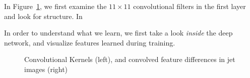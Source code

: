 In Figure~\ref{fig:convkernels}, we first examine the $11\times11$ convolutional filters in the first layer and look for structure. In

In order to understand what we learn, we first take a look \emph{inside} the deep network, and visualize features learned during training.

\begin{figure}[bt]
  \begin{center}
      \caption{Convolutional Kernels (left), and convolved feature differences in jet images (right)}
      \label{fig:convkernels}

    \end{center}
\end{figure}

